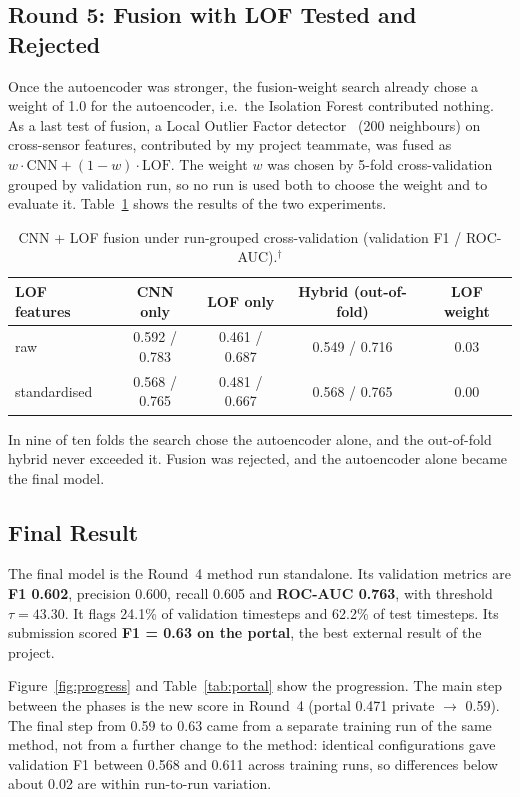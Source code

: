 \documentclass[runningheads]{llncs}
\newcommand{\doc}{$^\dagger$}
\begin{document}
\subsection{Round 5: Fusion with LOF Tested and Rejected}

Once the autoencoder was stronger, the fusion-weight search already chose a weight of 1.0 for the autoencoder, i.e.\ the Isolation Forest contributed nothing. As a last test of fusion, a Local Outlier Factor detector~\cite{breunig2000lof} (200 neighbours) on cross-sensor features, contributed by my project teammate, was fused as $w \cdot \text{CNN} + (1-w) \cdot \text{LOF}$. The weight $w$ was chosen by 5-fold cross-validation grouped by validation run, so no run is used both to choose the weight and to evaluate it. Table~\ref{tab:lof} shows the results of the two experiments.

\begin{table}[ht]
\centering
\caption{CNN + LOF fusion under run-grouped cross-validation (validation F1 / ROC-AUC).\doc}\label{tab:lof}
\begin{tabular}{|l|c|c|c|c|}
\hline
LOF features & CNN only & LOF only & Hybrid (out-of-fold) & LOF weight \\
\hline
raw & 0.592 / 0.783 & 0.461 / 0.687 & 0.549 / 0.716 & 0.03 \\
standardised & 0.568 / 0.765 & 0.481 / 0.667 & 0.568 / 0.765 & 0.00 \\
\hline
\end{tabular}
\end{table}

In nine of ten folds the search chose the autoencoder alone, and the out-of-fold hybrid never exceeded it. Fusion was rejected, and the autoencoder alone became the final model.

\subsection{Final Result}

The final model is the Round~4 method run standalone. Its validation metrics are \textbf{F1 0.602}, precision 0.600, recall 0.605 and \textbf{ROC-AUC 0.763}, with threshold $\tau = 43.30$. It flags 24.1\% of validation timesteps and 62.2\% of test timesteps. Its submission scored \textbf{F1 = 0.63 on the portal}, the best external result of the project.

Figure~\ref{fig:progress} and Table~\ref{tab:portal} show the progression. The main step between the phases is the new score in Round~4 (portal 0.471 private $\rightarrow$ 0.59). The final step from 0.59 to 0.63 came from a separate training run of the same method, not from a further change to the method: identical configurations gave validation F1 between 0.568 and 0.611 across training runs, so differences below about 0.02 are within run-to-run variation.
\end{document}

